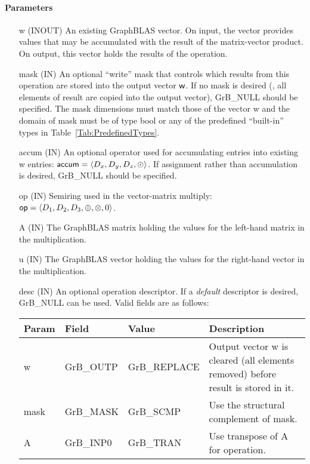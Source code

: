 \paragraph{Parameters}

\begin{itemize}[leftmargin=1.1in]
    \item[{\sf w}]    ({\sf INOUT}) An existing GraphBLAS vector.  On input, the
    vector provides values that may be accumulated with the result of the
    matrix-vector product.  On output, this vector holds the results of the
    operation.
    
    \item[{\sf mask}] ({\sf IN}) An optional ``write'' mask that controls which
    results from this operation are stored into the output vector
    ${\sf w}$.  If no mask is desired (\ie, all elements
    of result are copied into the output vector), {\sf GrB\_NULL}
    should be specified. The mask dimensions must match those of the
    vector {\sf w} and the domain of {\sf mask} must be
    of type {\sf bool} or any of the predefined ``built-in'' types in
    Table~\ref{Tab:PredefinedTypes}.

	\item[{\sf accum}]  ({\sf IN}) An optional operator used for accumulating
    entries into existing {\sf w} entries: ${\sf accum} = \langle D_x,
    D_y, D_z,\odot \rangle$. If assignment rather than accumulation is
    desired, {\sf GrB\_NULL} should be specified.

    \item[{\sf op}]   ({\sf IN}) Semiring used in the vector-matrix
    multiply: ${\sf op}=\langle D_1,D_2,D_3,\oplus,\otimes,0 \rangle$.
    
    \item[{\sf A}]    ({\sf IN}) The GraphBLAS matrix holding the values
    for the left-hand matrix in the multiplication.
    
    \item[{\sf u}]    ({\sf IN}) The GraphBLAS vector holding the values for
    the right-hand vector in the multiplication.

    \item[{\sf desc}] ({\sf IN}) An optional operation descriptor.  If
    a \emph{default} descriptor is desired, {\sf GrB\_NULL} can be
    used.  Valid fields are as follows: \\
    
    \begin{tabular}{lllp{2.5in}}
    Param & Field  & Value & Description \\
    \hline
    {\sf w}    & {\sf GrB\_OUTP} & {\sf GrB\_REPLACE} & Output vector {\sf w} is cleared (all elements removed) before result is stored in it.\\
    {\sf mask} & {\sf GrB\_MASK} & {\sf GrB\_SCMP}   & Use the structural complement of {\sf mask}. \\
    {\sf A}    & {\sf GrB\_INP0} & {\sf GrB\_TRAN}   & Use transpose of {\sf A} for operation. \\
    \end{tabular}
\end{itemize}

